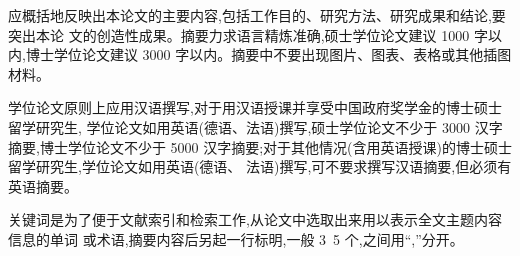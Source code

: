 应概括地反映出本论文的主要内容,包括工作目的、研究方法、研究成果和结论,要突出本论
 文的创造性成果。摘要力求语言精炼准确,硕士学位论文建议 1000
  字以内,博士学位论文建议 3000 字以内。摘要中不要出现图片、图表、表格或其他插图材料。


学位论文原则上应用汉语撰写,对于用汉语授课并享受中国政府奖学金的博士硕士留学研究生,
 学位论文如用英语(德语、法语)撰写,硕士学位论文不少于 3000
  汉字摘要,博士学位论文不少于 5000
   汉字摘要;对于其他情况(含用英语授课)的博士硕士留学研究生,学位论文如用英语(德语、
    法语)撰写,可不要求撰写汉语摘要,但必须有英语摘要。


关键词是为了便于文献索引和检索工作,从论文中选取出来用以表示全文主题内容信息的单词 或术语,摘要内容后另起一行标明,一般 3~5 个,之间用“,”分开。